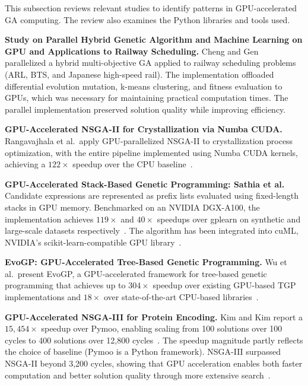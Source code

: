 \documentclass[a4paper,14pt]{extarticle}
\begin{document}

This subsection reviews relevant studies to identify patterns in GPU-accelerated GA computing. The review also examines the Python libraries and tools used.

\textbf{Study on Parallel Hybrid Genetic Algorithm and Machine Learning on GPU and Applications to Railway Scheduling.} Cheng and Gen~\cite{cheng2020parallel} parallelized a hybrid multi-objective GA applied to railway scheduling problems (ARL, BTS, and Japanese high-speed rail). The implementation offloaded differential evolution mutation, k-means clustering, and fitness evaluation to GPUs, which was necessary for maintaining practical computation times. The parallel implementation preserved solution quality while improving efficiency.

\textbf{GPU-Accelerated NSGA-II for Crystallization via Numba CUDA.} Rangavajhala et al.\ apply GPU-parallelized NSGA-II to crystallization process optimization, with the entire pipeline implemented using Numba CUDA kernels, achieving a $122\times$ speedup over the CPU baseline~\cite{rangavajhala2024accelerating}.

\textbf{GPU-Accelerated Stack-Based Genetic Programming: Sathia et al.} Candidate expressions are represented as prefix lists evaluated using fixed-length stacks in GPU memory. Benchmarked on an NVIDIA DGX-A100, the implementation achieves $119\times$ and $40\times$ speedups over gplearn on synthetic and large-scale datasets respectively~\cite{sathia2021accelerating}. The algorithm has been integrated into cuML, NVIDIA's scikit-learn-compatible GPU library~\cite{sathia2021accelerating}.

\textbf{EvoGP: GPU-Accelerated Tree-Based Genetic Programming.} Wu et al.\ present EvoGP, a GPU-accelerated framework for tree-based genetic programming that achieves up to $304\times$ speedup over existing GPU-based TGP implementations and $18\times$ over state-of-the-art CPU-based libraries~\cite{wu2025evogp}.

\textbf{GPU-Accelerated NSGA-III for Protein Encoding.} Kim and Kim report a $15{,}454\times$ speedup over Pymoo, enabling scaling from 100 solutions over 100 cycles to 400 solutions over 12,800 cycles~\cite{kim2024gpu}. The speedup magnitude partly reflects the choice of baseline (Pymoo is a Python framework). NSGA-III surpassed NSGA-II beyond 3,200 cycles, showing that GPU acceleration enables both faster computation and better solution quality through more extensive search~\cite{kim2024gpu}.
\end{document}
